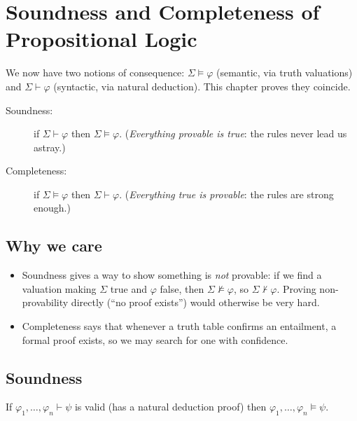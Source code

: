 \chapter{Soundness and Completeness of Propositional Logic}\label{ch:soundcomplete}

We now have two notions of consequence: $\Sigma\models\varphi$ (semantic, via truth
valuations) and $\Sigma\vdash\varphi$ (syntactic, via natural deduction). This chapter
proves they coincide.

\begin{important}
\begin{description}
  \item[Soundness:] if $\Sigma\vdash\varphi$ then $\Sigma\models\varphi$.
        (\emph{Everything provable is true}: the rules never lead us astray.)
  \item[Completeness:] if $\Sigma\models\varphi$ then $\Sigma\vdash\varphi$.
        (\emph{Everything true is provable}: the rules are strong enough.)
\end{description}
\end{important}

\section{Why we care}

\begin{itemize}
  \item Soundness gives a way to show something is \emph{not} provable: if we find a
        valuation making $\Sigma$ true and $\varphi$ false, then $\Sigma\not\models\varphi$,
        so $\Sigma\nvdash\varphi$. Proving non-provability directly (``no proof
        exists'') would otherwise be very hard.
  \item Completeness says that whenever a truth table confirms an entailment, a formal
        proof exists, so we may search for one with confidence.
\end{itemize}

\section{Soundness}

\begin{theorem}[Soundness]
If $\varphi_1,\dots,\varphi_n\vdash\psi$ is valid (has a natural deduction proof) then
$\varphi_1,\dots,\varphi_n\models\psi$.
\end{theorem}

